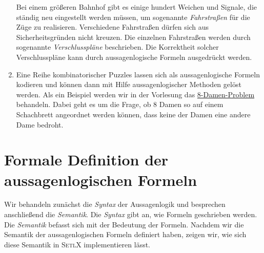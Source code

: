 \begin{enumerate}
      Bei einem gr\"{o}\ss{}eren Bahnhof gibt es einige hundert Weichen und Signale, die st\"{a}ndig
      neu eingestellt werden m\"{u}ssen, um sogenannte \emph{\color{blue}Fahrstra\ss{}en} f\"{u}r die Z\"{u}ge zu
      realisieren.  Verschiedene Fahrstra\ss{}en d\"{u}rfen sich aus Sicherheitsgr\"{u}nden nicht kreuzen.  
      Die einzelnen Fahrstra\ss{}en werden durch sogenannte \emph{\color{blue}Verschlusspl\"{a}ne} beschrieben.
      Die Korrektheit solcher Verschlusspl\"{a}ne kann durch aussagenlogische Formeln ausgedr\"{u}ckt werden.
\item Eine Reihe kombinatorischer Puzzles lassen sich als aussagenlogische Formeln
      kodieren und k\"{o}nnen dann mit Hilfe aussagenlogischer Methoden gel\"{o}st werden.  Als ein
      Beispiel werden wir in der Vorlesung das 
      \href{https://en.wikipedia.org/wiki/Eight_queens_puzzle}{8-Damen-Problem} behandeln.  Dabei
      geht es um die Frage, ob 8 Damen so auf einem Schachbrett angeordnet werden k\"{o}nnen, dass
      keine der Damen eine andere Dame bedroht.
\end{enumerate}

\section{Formale Definition der aussagenlogischen Formeln}
Wir behandeln zun\"{a}chst die \emph{\color{blue}Syntax} der Aussagenlogik und besprechen anschlie\ss{}end die
\emph{\color{blue}Semantik}.  Die \textsl{Syntax} gibt an, wie Formeln geschrieben werden.
Die \emph{\color{blue}Semantik} befasst sich mit der Bedeutung der Formeln.
Nachdem wir die Semantik der aussagenlogischen Formeln definiert haben, zeigen wir,
wie sich diese Semantik in \textsc{SetlX} implementieren l\"{a}sst.

